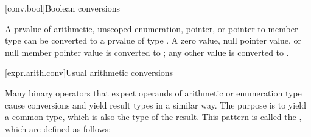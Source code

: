 [conv.bool]{Boolean conversions}

\pnum
{}%
A prvalue of arithmetic, unscoped enumeration, pointer, or pointer-to-member
type can be converted to a prvalue of type . A zero value, null
pointer value, or null member pointer value is converted to ; any
other value is converted to .


[expr.arith.conv]{Usual arithmetic conversions}

\pnum
Many binary operators that expect operands of arithmetic or enumeration
type cause conversions and yield result types in a similar way. The
purpose is to yield a common type, which is also the type of the result.
This pattern is called the ,
which are defined as follows:

